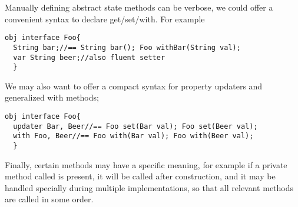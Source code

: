 Manually defining abstract state methods can be verbose, we could offer a convenient syntax to 
declare get/set/with.
For example
\begin{lstlisting}
obj interface Foo{
  String bar;//== String bar(); Foo withBar(String val);
  var String beer;//also fluent setter
  }
\end{lstlisting}

We may also want to offer a compact syntax for property updaters and generalized with methods;
\begin{lstlisting}
obj interface Foo{
  updater Bar, Beer//== Foo set(Bar val); Foo set(Beer val);
  with Foo, Beer//== Foo with(Bar val); Foo with(Beer val);
  }
\end{lstlisting}
Finally, certain methods may have a specific meaning, for example
if a private method called \Q@init@ is present, it will be called after construction,
and it may be handled specially during multiple implementations, so that all relevant \Q@init@ methods are
called in some order.
